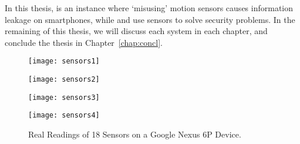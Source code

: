 In this thesis, {\spp} is an instance where `misusing' motion sensors causes information leakage on smartphones, while {\uu} and {\mv} use sensors to solve security problems. In the remaining of this thesis, we will discuss each system in each chapter, and conclude the thesis in Chapter~\ref{chap:concl}. 
%
%
%
%
%





\begin{landscape}
	\begin{figure*}[h]
		\begin{minipage}[t]{0.25\textwidth}
			\texttt{[image: sensors1]}
		\end{minipage}
		\hspace{.60in}
		\begin{minipage}[t]{0.25\textwidth}
			\texttt{[image: sensors2]}
		\end{minipage}
		\hspace{.60in}
		\begin{minipage}[t]{0.25\textwidth}
			\texttt{[image: sensors3]}
		\end{minipage}  
		\hspace{.60in}
		\begin{minipage}[t]{0.25\textwidth}
			\texttt{[image: sensors4]}
		\end{minipage}  
		\caption{Real Readings of 18 Sensors on a Google Nexus 6P Device.}
		\label{fig:sensors}
	\end{figure*}
\end{landscape}

